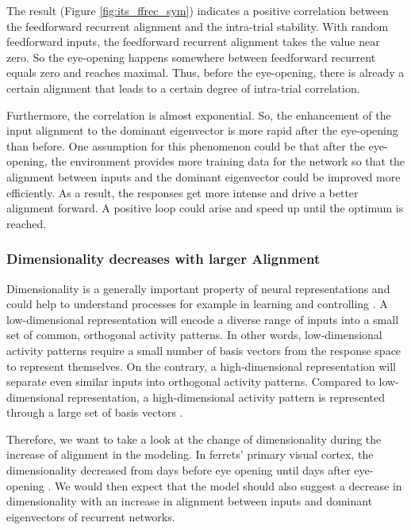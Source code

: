 \documentclass[11pt]{article}
\begin{document}
	The result (Figure \ref{fig:its_ffrec_sym}) indicates a positive correlation between the feedforward recurrent alignment and the intra-trial stability. With random feedforward inputs, the feedforward recurrent alignment takes the value near zero. So the eye-opening happens somewhere between feedforward recurrent equals zero and reaches maximal. Thus, before the eye-opening, there is already a certain alignment that leads to a certain degree of intra-trial correlation. 
	
	Furthermore, the correlation is almost exponential. So, the enhancement of the input alignment to the dominant eigenvector is more rapid after the eye-opening than before. One assumption for this phenomenon could be that after the eye-opening, the environment provides more training data for the network so that the alignment between inputs and the dominant eigenvector could be improved more efficiently. As a result, the responses get more intense and drive a better alignment forward. A positive loop could arise and speed up until the optimum is reached. 
	
	\subsubsection{Dimensionality decreases with larger Alignment}
	
	Dimensionality is a generally important property of neural representations and could help to understand processes for example in learning and controlling \cite{bartolo2020dimensionality, badre2021dimensionality}. A low-dimensional representation will encode a diverse range of inputs into a small set of common, orthogonal activity patterns. In other words, low-dimensional activity patterns require a small number of basis vectors from the response space to represent themselves. On the contrary, a high-dimensional representation will separate even similar inputs into orthogonal activity patterns. Compared to low-dimensional representation, a high-dimensional activity pattern is represented through a large set of basis vectors \cite{badre2021dimensionality}. 
	
	Therefore, we want to take a look at the change of dimensionality during the increase of alignment in the modeling. In ferrets' primary visual cortex, the dimensionality decreased from days before eye opening until days after eye-opening \cite{tragenap2023nature}. We would then expect that the model should also suggest a decrease in dimensionality with an increase in alignment between inputs and dominant eigenvectors of recurrent networks. 
	
\end{document}

